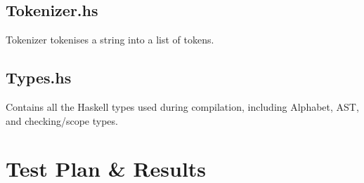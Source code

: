 \documentclass[twoside]{report}
\begin{document}
\section{Tokenizer.hs}
Tokenizer tokenises a string into a list of tokens.

\section{Types.hs}
Contains all the Haskell types used during compilation, including Alphabet, AST, and checking/scope types.



\chapter{Test Plan \& Results}
\label{test_plan_and_results}
\end{document}
